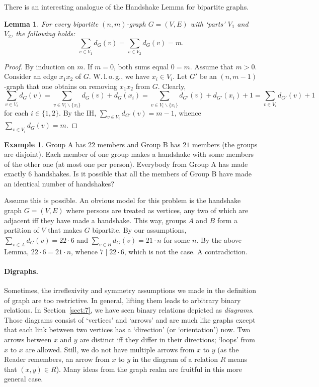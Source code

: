 \documentclass[12pt,notitlepage]{article}
\theoremstyle{plain}
\newtheorem{lemma}[thm]{Lemma}
\theoremstyle{definition}
\newtheorem{exm}[thm]{Example}
\theoremstyle{plain}
\renewcommand{\setminus}{\smallsetminus}
\newcommand{\1}{\mathbf{1}}
\newcommand{\0}{\mathbf{0}}
\newcommand{\dvd}{\mathop{\mid}}
\begin{document}
There is an interesting analogue of the Handshake Lemma for bipartite graphs.
\begin{lemma}
For every bipartite $(n, m)$-graph $G = (V, E)$ with `parts' $V_1$ and $V_2$, the following holds:
$$\sum_{v \in V_1} d_G(v) = \sum_{v \in V_2} d_G(v) = m.$$
\end{lemma}
\begin{proof}
By induction on $m$. If $m = 0$, both sums equal $0 = m$. Assume that $m > 0$. Consider an edge $x_1 x_2$ of $G$.  W.\,l.\,o.\,g., we have $x_i \in V_i$. Let $G'$ be an $(n,m - 1)$-graph that one obtains on removing $x_1 x_2$ from $G$. Clearly, $$\sum_{v \in V_i} d_G(v) = \sum_{v \in V_i \setminus \{ x_i \} } d_G(v) + d_G(x_i) = \sum_{v \in V_i \setminus \{ x_i \} } d_{G'}(v) + d_{G'}(x_i) + 1 = \sum_{v \in V_i} d_{G'}(v) + 1$$
for each $i \in \{1, 2\}$. By the IH, $\sum_{v \in V_i} d_{G'}(v) = m - 1$, whence $\sum_{v \in V_i} d_G(v) = m$.
\end{proof}

\begin{exm}
Group A has $22$ members and Group B has $21$ members (the groups are disjoint). Each member of one group makes a handshake with some members of the other one (at most one per person). Everybody from Group A has made exactly $6$ handshakes. Is it possible that all the members of Group B have made an identical number of handshakes?

Assume this is possible. An obvious model for this problem is the handshake graph $G = (V, E)$ where persons are treated as vertices, any two of which are adjacent iff they have made a handshake. This way, groups $A$ and $B$ form a partition of $V$ that makes $G$ bipartite. By our assumptions, $\sum_{v \in A} d_{G}(v) = 22\cdot 6$ and $\sum_{v \in B} d_{G}(v) = 21\cdot n$ for some $n$. By the above Lemma, $22 \cdot 6 = 21 \cdot n$, whence $7 \dvd 22 \cdot 6$, which is not the case. A contradiction.
\end{exm}

\paragraph{Digraphs.} Sometimes, the irreflexivity and symmetry assumptions we made in the definition of graph are too restrictive. In general, lifting them leads to arbitrary binary relations. In Section~\ref{sect:7}, we have seen binary relations depicted as \emph{diagrams}. Those diagrams consist of `vertices' and `arrows' and are much like graphs except that each link between two vertices has a `direction' (or `orientation') now. Two arrows between $x$ and $y$ are distinct iff they differ in their directions; `loops' from $x$ to $x$ are allowed. Still, we do not have multiple arrows from $x$ to $y$ (as the Reader remembers, an arrow from $x$ to $y$ in the diagram of a relation $R$ means that $(x,y) \in R$). Many ideas from the graph realm are fruitful in this more general case.
\end{document}
